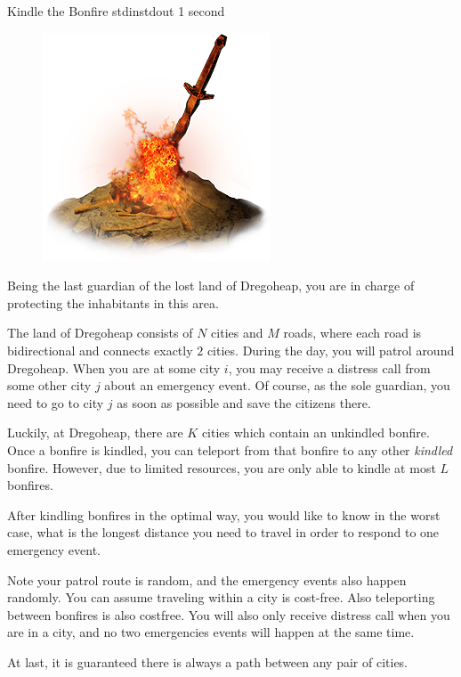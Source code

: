 \begin{problem}{Kindle the Bonfire}
{stdin}{stdout}
{1 second}{}{}

\begin{figure}
    \includegraphics[scale=0.5]{bonfire.png}
\end{figure}

Being the last guardian of the lost land of Dregoheap, you are in charge 
of protecting the inhabitants in this area.

The land of Dregoheap consists of $N$ cities and $M$ roads, where each road
is bidirectional and connects exactly $2$ cities. During the day, you will
patrol around Dregoheap. When you are at some city $i$, you may receive a
distress call from some other city $j$ about an emergency event. Of course, as 
the sole guardian, you need to go to city $j$ as soon as possible  and save the
citizens there.

Luckily, at Dregoheap, there are $K$ cities which contain an unkindled bonfire.
Once a bonfire is kindled, you can teleport from that bonfire to any other 
\textit{kindled} bonfire. However, due to limited resources, you are only able 
to kindle at most $L$ bonfires.

After kindling bonfires in the optimal way,
you would like to know in the worst case, what is the longest distance you need
to travel in order to respond to one emergency event.

Note your patrol route is random, and the emergency events also happen 
randomly. You can assume traveling within a city is cost-free. Also 
teleporting between bonfires is also costfree. You will also only receive 
distress call when you are in a city, and no two emergencies events will happen
at the same time.

At last, it is guaranteed there is always a path between any pair of cities.


\end{problem}
